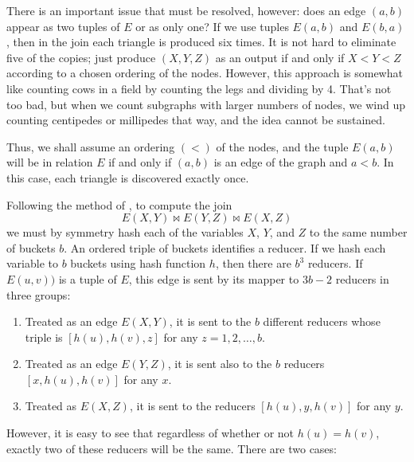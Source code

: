 There is an important issue that must be resolved, however: does an edge $(a,b)$ appear as two tuples of $E$ or as only one?  If we use tuples $E(a,b)$ and $E(b,a)$, then in the join each triangle is produced six times.  It is not hard to eliminate five of the copies; just produce $(X,Y,Z)$ as an output if and only if $X<Y<Z$ according to a chosen ordering of the nodes.  However, this approach is somewhat like counting cows in a field by counting the legs and dividing by 4.  That's not too bad, but when we count subgraphs with larger numbers of nodes, we wind up counting centipedes or millipedes that way, and the idea cannot be sustained.

Thus,  we shall assume an ordering $(<)$ of the nodes, and the tuple $E(a,b)$ will be in relation $E$ if and only if $(a,b)$ is an edge of the graph and $a<b$.  In this case, each triangle is discovered exactly once.

Following the method of \cite{AU10}, to compute the join
$$E(X,Y)\bowtie E(Y,Z)\bowtie E(X,Z)$$
we must by symmetry hash each of the variables $X$, $Y$, and $Z$ to the same number of buckets $b$.  An ordered triple of buckets identifies a reducer.  If we hash each variable to $b$ buckets using hash function $h$, then there are $b^3$ reducers.  If $E(u,v))$ is a tuple of $E$, this edge is sent by its mapper to $3b-2$ reducers in three groups:

\begin{enumerate}

\item
Treated as an edge $E(X,Y)$, it is sent to the $b$ different reducers whose triple is $[h(u),h(v),z]$ for any $z=1,2,\ldots,b$.

\item
Treated as an edge $E(Y,Z)$, it is sent also to the $b$ reducers $[x,h(u),h(v)]$ for any $x$.

\item
Treated as $E(X,Z)$, it is sent to the reducers $[h(u),y,h(v)]$ for any $y$.

\end{enumerate}
However, it is easy to see that regardless of whether or not $h(u)=h(v)$, exactly two of these reducers will be the same.  There are two cases:

